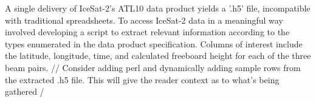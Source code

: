 A single delivery of IceSat-2's ATL10 data product yields a '.h5' file, incompatible with traditional spreadsheets. To access IceSat-2 data in a meaningful way involved developing a script to extract relevant information according to the types enumerated in the data product specification. Columns of interest include the latitude, longitude, time, and calculated freeboard height for each of the three beam pairs.
// Consider adding perl and dynamically adding sample rows from the extracted .h5 file. This will give the reader context as to what's being gathered /

